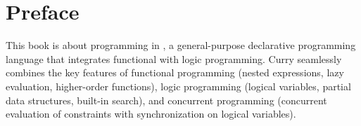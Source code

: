 \makeindex


\sloppy

\begin{center}
\end{center}
\setcounter{page}{0} 
\tableofcontents

\newpage
{}

\chapter*{Preface}

This book is about programming in \curryref,
a general-purpose declarative programming language
that integrates functional with logic programming.
Curry seamlessly combines the key features of
functional programming (nested expressions, lazy evaluation,
higher-order functions), logic programming (logical variables,
partial data structures, built-in search), and concurrent
programming (concurrent evaluation of constraints with synchronization
on logical variables).

